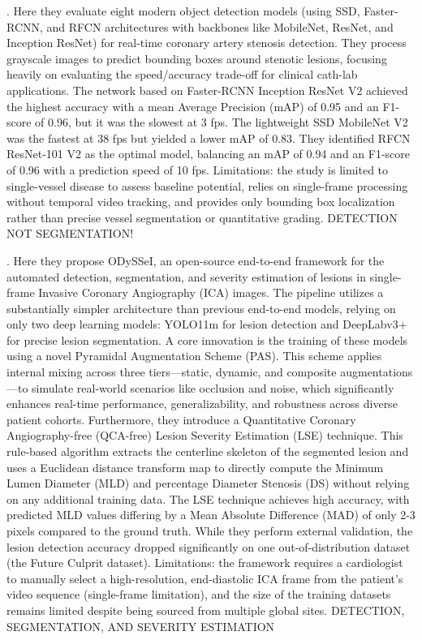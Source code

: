 \documentclass{article}
\begin{document}
\cite{Danilov2021}. Here they evaluate eight modern object detection models (using SSD, Faster-RCNN, and RFCN architectures with backbones like MobileNet, ResNet, and Inception ResNet) for real-time coronary artery stenosis detection. They process grayscale images to predict bounding boxes around stenotic lesions, focusing heavily on evaluating the speed/accuracy trade-off for clinical cath-lab applications. The network based on Faster-RCNN Inception ResNet V2 achieved the highest accuracy with a mean Average Precision (mAP) of 0.95 and an F1-score of 0.96, but it was the slowest at 3 fps. The lightweight SSD MobileNet V2 was the fastest at 38 fps but yielded a lower mAP of 0.83. They identified RFCN ResNet-101 V2 as the optimal model, balancing an mAP of 0.94 and an F1-score of 0.96 with a prediction speed of 10 fps. Limitations: the study is limited to single-vessel disease to assess baseline potential, relies on single-frame processing without temporal video tracking, and provides only bounding box localization rather than precise vessel segmentation or quantitative grading. DETECTION NOT SEGMENTATION!


\cite{choudhary2026odysseiopensourceendtoendframework}. Here they propose ODySSeI, an open-source end-to-end framework for the automated detection, segmentation, and severity estimation of lesions in single-frame Invasive Coronary Angiography (ICA) images. The pipeline utilizes a substantially simpler architecture than previous end-to-end models, relying on only two deep learning models: YOLO11m for lesion detection and DeepLabv3+ for precise lesion segmentation. A core innovation is the training of these models using a novel Pyramidal Augmentation Scheme (PAS). This scheme applies internal mixing across three tiers—static, dynamic, and composite augmentations—to simulate real-world scenarios like occlusion and noise, which significantly enhances real-time performance, generalizability, and robustness across diverse patient cohorts. Furthermore, they introduce a Quantitative Coronary Angiography-free (QCA-free) Lesion Severity Estimation (LSE) technique. This rule-based algorithm extracts the centerline skeleton of the segmented lesion and uses a Euclidean distance transform map to directly compute the Minimum Lumen Diameter (MLD) and percentage Diameter Stenosis (DS) without relying on any additional training data. The LSE technique achieves high accuracy, with predicted MLD values differing by a Mean Absolute Difference (MAD) of only 2-3 pixels compared to the ground truth. While they perform external validation, the lesion detection accuracy dropped significantly on one out-of-distribution dataset (the Future Culprit dataset). Limitations: the framework requires a cardiologist to manually select a high-resolution, end-diastolic ICA frame from the patient's video sequence (single-frame limitation), and the size of the training datasets remains limited despite being sourced from multiple global sites. DETECTION, SEGMENTATION, AND SEVERITY ESTIMATION

 
 
\end{document}
